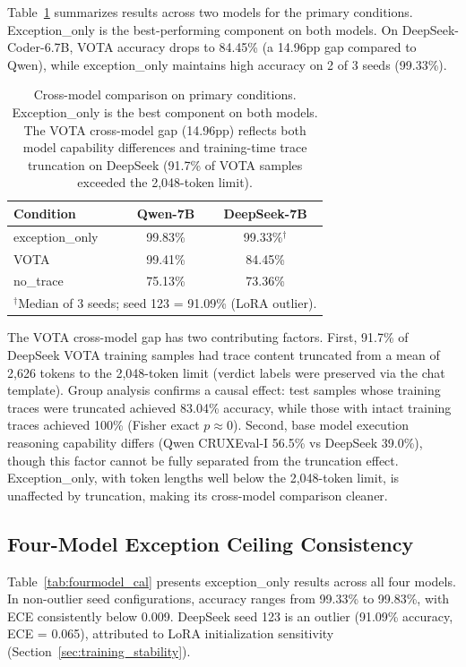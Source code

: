 \documentclass[11pt]{article}
\begin{document}
Table~\ref{tab:crossmodel} summarizes results across two models for the primary conditions. Exception\_only is the best-performing component on both models. On DeepSeek-Coder-6.7B, VOTA accuracy drops to 84.45\% (a 14.96pp gap compared to Qwen), while exception\_only maintains high accuracy on 2 of 3 seeds (99.33\%).

\begin{table}[t]
\centering
\caption{Cross-model comparison on primary conditions. Exception\_only is the best component on both models. The VOTA cross-model gap (14.96pp) reflects both model capability differences and training-time trace truncation on DeepSeek (91.7\% of VOTA samples exceeded the 2,048-token limit).}
\label{tab:crossmodel}
\begin{tabular}{lcc}
\toprule
Condition & Qwen-7B & DeepSeek-7B \\
\midrule
exception\_only & 99.83\% & 99.33\%$^{\dagger}$ \\
VOTA & 99.41\% & 84.45\% \\
no\_trace & 75.13\% & 73.36\% \\
\bottomrule
\multicolumn{3}{l}{\small $^{\dagger}$Median of 3 seeds; seed 123 = 91.09\% (LoRA outlier).}
\end{tabular}
\end{table}

The VOTA cross-model gap has two contributing factors. First, 91.7\% of DeepSeek VOTA training samples had trace content truncated from a mean of 2,626 tokens to the 2,048-token limit (verdict labels were preserved via the chat template). Group analysis confirms a causal effect: test samples whose training traces were truncated achieved 83.04\% accuracy, while those with intact training traces achieved 100\% (Fisher exact $p \approx 0$). Second, base model execution reasoning capability differs (Qwen CRUXEval-I 56.5\% vs DeepSeek 39.0\%), though this factor cannot be fully separated from the truncation effect. Exception\_only, with token lengths well below the 2,048-token limit, is unaffected by truncation, making its cross-model comparison cleaner.

\subsection{Four-Model Exception Ceiling Consistency}
\label{sec:fourmodel}

Table~\ref{tab:fourmodel_cal} presents exception\_only results across all four models. In non-outlier seed configurations, accuracy ranges from 99.33\% to 99.83\%, with ECE consistently below 0.009. DeepSeek seed 123 is an outlier (91.09\% accuracy, ECE = 0.065), attributed to LoRA initialization sensitivity (Section~\ref{sec:training_stability}).
\end{document}
